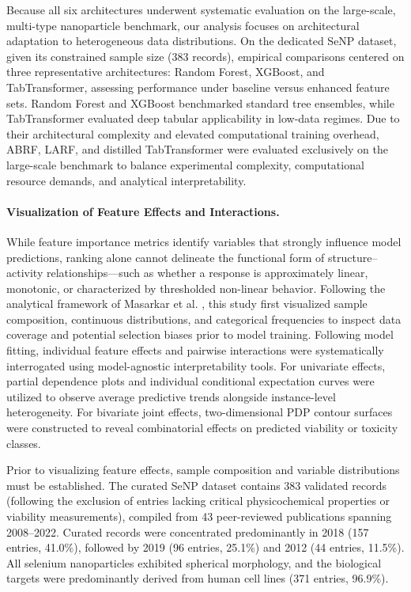 Because all six architectures underwent systematic evaluation on the large-scale, multi-type nanoparticle benchmark, our analysis focuses on architectural adaptation to heterogeneous data distributions. On the dedicated SeNP dataset, given its constrained sample size (383 records), empirical comparisons centered on three representative architectures: Random Forest, XGBoost, and TabTransformer, assessing performance under baseline versus enhanced feature sets. Random Forest and XGBoost benchmarked standard tree ensembles, while TabTransformer evaluated deep tabular applicability in low-data regimes. Due to their architectural complexity and elevated computational training overhead, ABRF, LARF, and distilled TabTransformer were evaluated exclusively on the large-scale benchmark to balance experimental complexity, computational resource demands, and analytical interpretability.

\paragraph{Visualization of Feature Effects and Interactions.}
While feature importance metrics identify variables that strongly influence model predictions, ranking alone cannot delineate the functional form of structure--activity relationships—such as whether a response is approximately linear, monotonic, or characterized by thresholded non-linear behavior. Following the analytical framework of Masarkar et al. \cite{masarkar2024}, this study first visualized sample composition, continuous distributions, and categorical frequencies to inspect data coverage and potential selection biases prior to model training. Following model fitting, individual feature effects and pairwise interactions were systematically interrogated using model-agnostic interpretability tools. For univariate effects, partial dependence plots and individual conditional expectation curves were utilized to observe average predictive trends alongside instance-level heterogeneity. For bivariate joint effects, two-dimensional PDP contour surfaces were constructed to reveal combinatorial effects on predicted viability or toxicity classes.

Prior to visualizing feature effects, sample composition and variable distributions must be established. The curated SeNP dataset contains 383 validated records (following the exclusion of entries lacking critical physicochemical properties or viability measurements), compiled from 43 peer-reviewed publications spanning 2008--2022. Curated records were concentrated predominantly in 2018 (157 entries, 41.0\%), followed by 2019 (96 entries, 25.1\%) and 2012 (44 entries, 11.5\%). All selenium nanoparticles exhibited spherical morphology, and the biological targets were predominantly derived from human cell lines (371 entries, 96.9\%).

